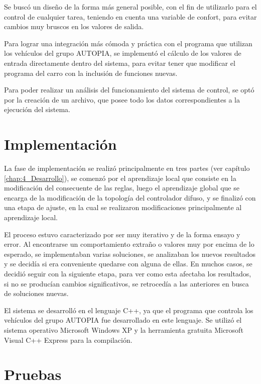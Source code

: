 Se buscó un diseño de la forma más general posible, con el fin de utilizarlo para el control de cualquier tarea, teniendo en cuenta una variable de confort, para evitar cambios muy bruscos en los valores de salida.

Para lograr una integración más cómoda y práctica con el programa que utilizan los vehículos del grupo AUTOPIA, se implementó el cálculo de los valores de entrada directamente dentro del sistema, para evitar tener que modificar el programa del carro con la inclusión de funciones nuevas.

Para poder realizar un análisis del funcionamiento del sistema de control, se optó por la creación de un archivo, que posee todo los datos correspondientes a la ejecución del sistema. 


\section{Implementación}
\label{subsec:implementacion}


La fase de implementación se realizó principalmente en tres partes (ver capítulo \ref{chap:4_Desarrollo}), se comenzó por el aprendizaje local que consiste en la modificación del consecuente de las reglas, luego el aprendizaje global que se encarga de la modificación de la topología del controlador difuso, y se finalizó con una etapa de ajuste, en la cual se realizaron modificaciones principalmente al aprendizaje local.

El proceso estuvo caracterizado por ser muy iterativo y de la forma ensayo y error. Al encontrarse un comportamiento extraño o valores muy por encima de lo esperado, se implementaban varias soluciones, se analizaban los nuevos resultados y se decidía si era conveniente quedarse con alguna de ellas. En muchos casos, se decidió seguir con la siguiente etapa, para ver como esta afectaba los resultados, si no se producían cambios significativos, se retrocedía a las anteriores en busca de soluciones nuevas.

El sistema se desarrolló en el lenguaje \gls{C++}, ya que el programa que controla los vehículos del grupo AUTOPIA fue desarrollado en este lenguaje. Se utilizó el sistema operativo \gls{Microsoft Windows XP} y la herramienta gratuita \gls{Microsoft Visual C++ Express} para la compilación. 
  

\section{Pruebas}
\label{subsec:pruebas}

